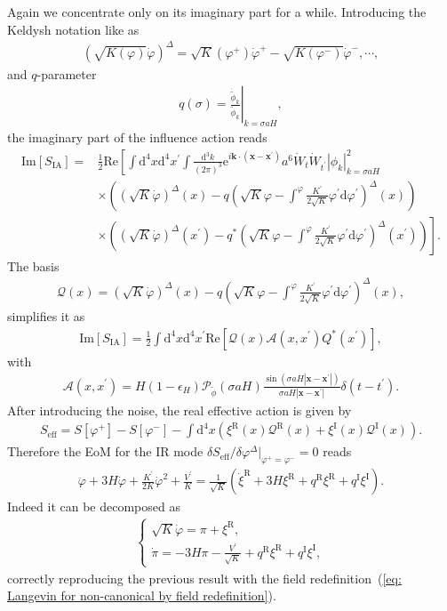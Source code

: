 \documentclass[aps, prd
, preprint
, nofootinbib 
]{revtex4-1}
\newcommand{\dd}{\mathrm{d}}
\newcommand{\ee}{\mathrm{e}}
\newcommand{\calP}{\mathcal{P}}
\renewcommand{\Re}{\mathrm{Re}}
\renewcommand{\Im}{\mathrm{Im}}
\newcommand{\dk}{\frac{\dd^3k}{(2\pi)^3}}
\newcommand{\bae}[1]{\begin{align} #1 \end{align}}
\newcommand{\bce}[1]{\begin{cases} #1 \end{cases}}
\begin{document}
Again we concentrate only on its imaginary part for a while. Introducing the Keldysh notation like as
\bae{
	\left(\sqrt{K(\varphi)}\dot{\varphi}\right)^\Delta=\sqrt{K}(\varphi^+)\dot{\varphi}^+-\sqrt{K(\varphi^-)}\dot{\varphi}^-, \cdots,
}
and $q$-parameter 
\bae{
	q(\sigma)=\left.\frac{\dot{\tilde{\phi}}_k}{\tilde{\phi}_k}\right|_{k=\sigma aH},
}
the imaginary part of the influence action reads
\bae{
	\Im[S_\text{IA}]=&\frac{1}{2}\Re\left[\int\dd^4x\dd^4x^\prime\int\dk\ee^{i\mathbf{k}\cdot(\mathbf{x}-\mathbf{x}^\prime)}
	a^6\dot{W}_t\dot{W}_{t^\prime}|\phi_k|^2_{k=\sigma aH} \right. \nonumber \\
	&\times\left(\left(\sqrt{K}\dot{\varphi}\right)^\Delta(x)
	-q\left(\sqrt{K}\varphi-\int^\varphi\frac{K^\prime}{2\sqrt{K}}\varphi^\prime\dd\varphi^\prime\right)^\Delta(x)\right) \nonumber \\
	&\left.\times\left(\left(\sqrt{K}\dot{\varphi}\right)^\Delta(x^\prime)
	-q^*\left(\sqrt{K}\varphi-\int^\varphi\frac{K^\prime}{2\sqrt{K}}\varphi^\prime\dd\varphi^\prime\right)^\Delta(x^\prime)\right)\right].
}
The basis
\bae{
	\mathcal{Q}(x)=\left(\sqrt{K}\dot{\varphi}\right)^\Delta(x)
	-q\left(\sqrt{K}\varphi-\int^\varphi\frac{K^\prime}{2\sqrt{K}}\varphi^\prime\dd\varphi^\prime\right)^\Delta(x),
}
simplifies it as
\bae{
	\Im[S_\text{IA}]=\frac{1}{2}\int\dd^4x\dd^4x^\prime\Re\left[\mathcal{Q}(x)\mathcal{A}(x,x^\prime)Q^*(x^\prime)\right],
}
with
\bae{
	\mathcal{A}(x,x^\prime)=H(1-\epsilon_H)\calP_{\tilde{\phi}}(\sigma aH)
	\frac{\sin(\sigma aH|\mathbf{x}-\mathbf{x}^\prime|)}{\sigma aH|\mathbf{x}-\mathbf{x}^\prime|}\delta(t-t^\prime).
}
After introducing the noise, the real effective action is given by
\bae{
	S_\text{eff}=S[\varphi^+]-S[\varphi^-]-\int\dd^4x(\xi^\text{R}(x)\mathcal{Q}^\text{R}(x)+\xi^\text{I}(x)\mathcal{Q}^\text{I}(x)).
}
Therefore the EoM for the IR mode $\delta S_\text{eff}/\delta\varphi^\Delta|_{\varphi^+=\varphi^-}=0$ reads
\bae{
	\ddot{\varphi}+3H\dot{\varphi}+\frac{K^\prime}{2K}\dot{\varphi}^2+\frac{V^\prime}{K}=\frac{1}{\sqrt{K}}\left(\dot{\xi}^\text{R}
	+3H\xi^\text{R}+q^\text{R}\xi^\text{R}+q^\text{I}\xi^\text{I}\right).
}
Indeed it can be decomposed as
\bae{
	\bce{
		\displaystyle
		\sqrt{K}\dot{\varphi}=\pi+\xi^\text{R}, \\
		\displaystyle
		\dot{\pi}=-3H\pi-\frac{V^\prime}{\sqrt{K}}+q^\text{R}\xi^\text{R}+q^\text{I}\xi^\text{I},
	}
}
correctly reproducing the previous result with the field redefinition~(\ref{eq: Langevin for non-canonical by field redefinition}).
\end{document}
